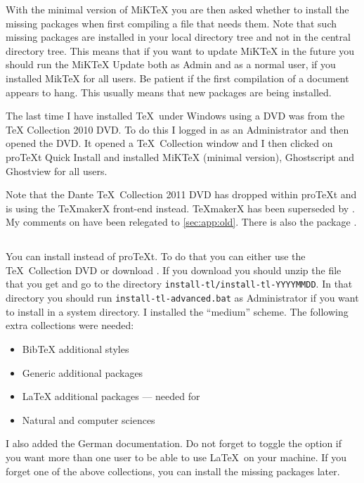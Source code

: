 With the minimal version of MiK\TeX{} you are then asked whether to
install the missing packages when first compiling a file that needs
them. Note that such missing packages are installed in your local
directory tree and not in the central directory tree.
This means that if you want to update MiK\TeX{} in the future
you should run the MiK\TeX{} Update both as Admin and as a normal user,
if you installed Mik\TeX{} for all users.
Be patient if the first compilation of a document appears to hang.
This usually means that new packages are being installed.

The last time I have installed \TeX\ under Windows using a DVD was
from the \TeX{} Collection 2010 DVD. 
To do this I logged in as an Administrator and then opened the DVD\@.
It opened a \TeX\ Collection window and I then clicked on pro\TeX t Quick Install and installed
MiK\TeX{} (minimal version),
Ghostscript and Ghostview for all users.

Note that the Dante \TeX\ Collection 2011 DVD has dropped
\TeXnicCenter within pro\TeX t and is using the \TeX makerX front-end instead.
\TeX makerX has been superseded by \TeXstudio.
My comments on \TeXnicCenter have been relegated to \cref{sec:app:old}.
There is also the package \TeXmaker.


\subsection{\TeXLive}%
\label{sec:app:texlive}

You can install \TeXLive instead of pro\TeX t. To do that you can
either use the \TeX\ Collection DVD or download \TeXLive. If you
download \TeXLive you should unzip the file that you get and go to the
directory \texttt{install-tl/install-tl-YYYYMMDD}. In that directory you
should run \texttt{install-tl-advanced.bat} as Administrator if you want to install
\TeXLive in a system directory. I installed the \enquote{medium}
scheme. The following extra collections were needed:
\begin{itemize}
\item \textsf{BibTeX additional styles}
\item \textsf{Generic additional packages}
\item \textsf{LaTeX additional packages} --- needed for 
\item \textsf{Natural and computer sciences}
\end{itemize}
I also added the German documentation. Do not forget to toggle the
option  if you want more than one user to be able to
use \LaTeX\ on your machine. If you forget one of the above
collections, you can install the missing packages later.

